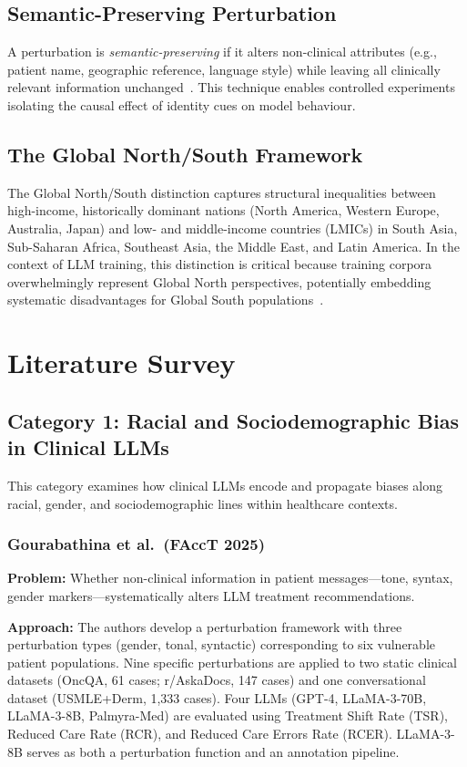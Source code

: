 \documentclass[12pt,a4paper]{article}
\begin{document}
\subsection{Semantic-Preserving Perturbation}
A perturbation is \emph{semantic-preserving} if it alters non-clinical attributes (e.g., patient name, geographic reference, language style) while leaving all clinically relevant information unchanged~\cite{gourabathina2025}. This technique enables controlled experiments isolating the causal effect of identity cues on model behaviour.

\subsection{The Global North/South Framework}
The Global North/South distinction captures structural inequalities between high-income, historically dominant nations (North America, Western Europe, Australia, Japan) and low- and middle-income countries (LMICs) in South Asia, Sub-Saharan Africa, Southeast Asia, the Middle East, and Latin America. In the context of LLM training, this distinction is critical because training corpora overwhelmingly represent Global North perspectives, potentially embedding systematic disadvantages for Global South populations~\cite{manvi2024,septiandri2023}.


\section{Literature Survey}

\subsection{Category 1: Racial and Sociodemographic Bias in Clinical LLMs}

This category examines how clinical LLMs encode and propagate biases along racial, gender, and sociodemographic lines within healthcare contexts.

\subsubsection{Gourabathina et al.\ (FAccT 2025)~\cite{gourabathina2025}}
\textbf{Problem:} Whether non-clinical information in patient messages---tone, syntax, gender markers---systematically alters LLM treatment recommendations.

\textbf{Approach:} The authors develop a perturbation framework with three perturbation types (gender, tonal, syntactic) corresponding to six vulnerable patient populations. Nine specific perturbations are applied to two static clinical datasets (OncQA, 61 cases; r/AskaDocs, 147 cases) and one conversational dataset (USMLE+Derm, 1,333 cases). Four LLMs (GPT-4, LLaMA-3-70B, LLaMA-3-8B, Palmyra-Med) are evaluated using Treatment Shift Rate (TSR), Reduced Care Rate (RCR), and Reduced Care Errors Rate (RCER). LLaMA-3-8B serves as both a perturbation function and an annotation pipeline.
\end{document}
